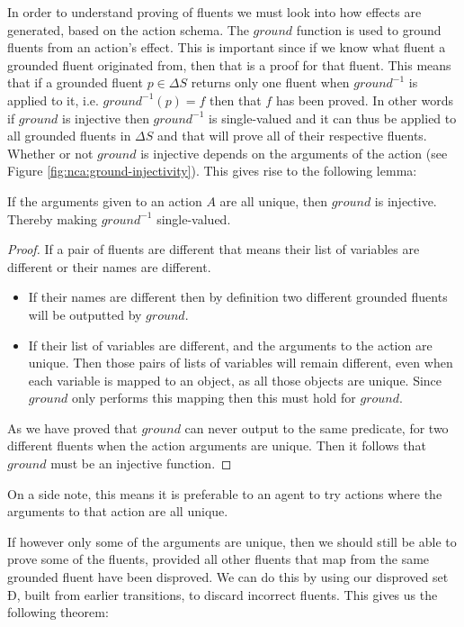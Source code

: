 \documentclass[../Master.tex]{subfiles}
\begin{document}
In order to understand proving of fluents we must look into how effects are generated, based on the action schema.
The $ground$ function is used to ground fluents from an action's effect. This is important since if we know what fluent a grounded fluent originated from, then that is a proof for that fluent. This means that if a grounded fluent $p \in \Delta S$ returns only one fluent when $ground^{-1}$ is applied to it, i.e. $ground^{-1}(p) = {f}$ then that $f$ has been proved. In other words if $ground$ is injective then $ground^{-1}$ is single-valued and it can thus be applied to all grounded fluents in $\Delta S$ and that will prove all of their respective fluents.
Whether or not $ground$ is injective depends on the arguments of the action (see Figure \ref*{fig:nca:ground-injectivity}).
This gives rise to the following lemma:
\begin{lemma}
If the arguments given to an action $A$ are all unique, then $ground$ is injective. Thereby making $ground^{-1}$ single-valued.

\begin{proof}
	If a pair of fluents are different that means their list of variables are different or their names are different. 
	\begin{itemize}
		\item If their names are different then by definition two different grounded fluents will be outputted by $ground$.
		
		\item If their list of variables are different, and the arguments to the action are unique. Then those pairs of lists of variables will remain different, even when each variable is mapped to an object, as all those objects are unique. Since $ground$ only performs this mapping then this must hold for $ground$.
	\end{itemize}	
	As we have proved that $ground$ can never output to the same predicate, for two different fluents when the action arguments are unique. Then it follows that $ground$ must be an injective function. 
\end{proof}
\end{lemma}

On a side note, this means it is preferable to an agent to try actions where the arguments to that action are all unique. 

If however only some of the arguments are unique, then we should still be able to prove some of the fluents, provided all other fluents that map from the same grounded fluent have been disproved. We can do this by using our disproved set $Ð$, built from earlier transitions, to discard incorrect fluents. This gives us the following theorem: 
\end{document}
